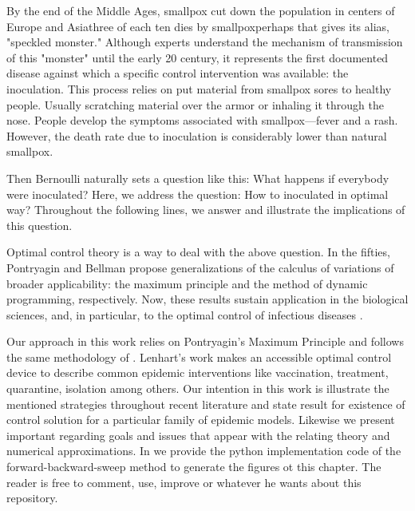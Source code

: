   By the end of the Middle Ages, smallpox cut down the 
population in centers of Europe and Asia\textemdash three of each ten dies by 
smallpox\textemdash perhaps that gives its alias, "speckled monster."  
Although experts understand the mechanism of transmission of this  "monster"
until the early 20  century, it represents the first documented disease
\citep[][]{bernoulli1760essai, bradley1971smallpox, Foppa2017} against which a
specific control intervention was available: the inoculation. This process
relies on put material from smallpox sores to healthy people. Usually scratching
material over the armor or inhaling it through the nose. People develop the
symptoms associated with smallpox---fever and a rash. However, the death rate
due to inoculation is considerably lower than natural smallpox.

  Then Bernoulli naturally sets a question like this: What happens if everybody
were inoculated? Here, we address the question: How to inoculated in optimal
way? Throughout the following lines, we answer and illustrate the
implications of this question. 

  Optimal control theory is a way to deal with the above question.  In the
fifties, Pontryagin and Bellman propose generalizations of the calculus of
variations of broader applicability:  the maximum principle and the method of
dynamic programming, respectively. Now, these results sustain application in the
biological sciences, and, in particular, to the optimal control
of infectious diseases \cite{}.

  Our approach in this work relies on Pontryagin's Maximum
Principle \cite{pontryagin1962} and follows the same methodology of
\citet{lenhart2007optimal}. Lenhart's work makes an accessible optimal control
device to describe common epidemic interventions like vaccination, treatment,
quarantine, isolation among others. Our intention in this work is illustrate
the mentioned strategies throughout recent literature and state result for
existence of control solution for a particular family of epidemic models.
Likewise we present  important regarding goals and issues that appear with the
relating theory and numerical approximations. In \cite{python_repo} we provide 
the python implementation code of the forward-backward-sweep method  to generate
the figures ot this chapter. The reader is free to comment, use, improve or 
whatever he wants about this repository.


























